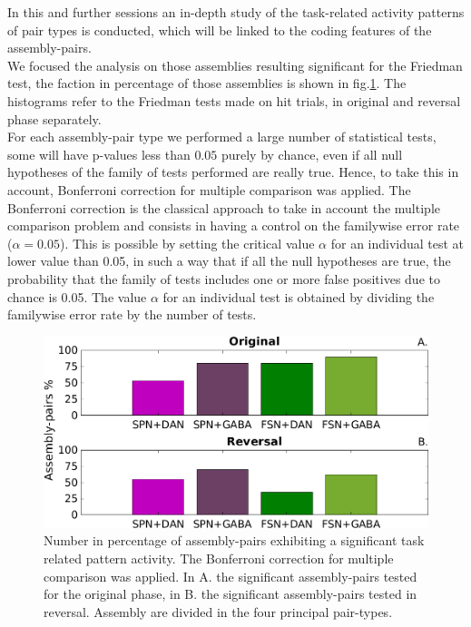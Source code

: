 In this and further sessions an in-depth study of the task-related activity patterns of pair types is conducted, which will be linked to the coding features of the assembly-pairs.\\
We focused the analysis on those assemblies resulting significant for the Friedman test, the faction in percentage of those assemblies is shown in fig.\ref{fig:PercAsFried}. The histograms refer to the Friedman tests made on hit trials, in original and reversal phase separately.\\For each assembly-pair type we performed a large number of statistical tests, some will have p-values less than $0.05$ purely by chance, even if all null hypotheses of the family of tests performed are really true. Hence, to take this in account, Bonferroni correction for multiple comparison was applied. The Bonferroni correction is the classical approach to take in account the multiple comparison problem and consists in having a control on the familywise error rate ($\alpha=0.05$). This is possible by setting the critical value $\alpha$ for an individual test at lower value than 0.05, in such a way that if all the null hypotheses are true, the probability that the family of tests includes one or more false positives due to chance is 0.05. The value $\alpha$ for an individual test is obtained by dividing the familywise error rate by the number of tests.\\
\begin{figure}
    \centering
    \includegraphics[scale=0.55]{figures/PercFriedHitTrialsBFf.png}
    \caption{Number in percentage of assembly-pairs exhibiting a significant task related pattern activity. The Bonferroni correction for multiple comparison was applied. In A. the significant assembly-pairs tested for the original phase, in B. the significant assembly-pairs tested in reversal. Assembly are divided in the four principal pair-types.}
    \label{fig:PercAsFried}
\end{figure}
